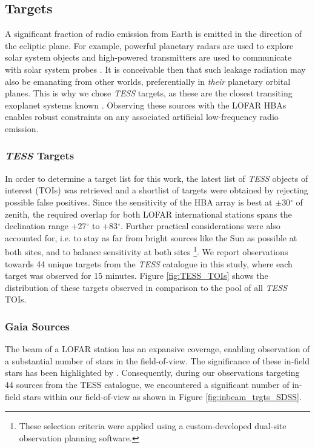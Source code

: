 \subsection{Targets} \label{sc:targets}

 A significant fraction of radio emission from Earth is emitted in the direction of the ecliptic plane. For example, powerful planetary radars are used to explore solar system objects \citep{Siemion_KEPLER_ApJ} and high-powered transmitters are used to communicate with solar system probes \citep{Enriquez:2017}. It is conceivable then that such leakage radiation may also be emanating from other worlds, preferentially in \textit{their} planetary orbital planes. This is why we chose \textit{TESS} targets, as these are the closest transiting exoplanet systems known \citep{kepler_2008,TESS_2015}. Observing these sources with the LOFAR HBAs enables robust constraints on any associated artificial low-frequency radio emission.  


\subsubsection{\textit{TESS} Targets} In order to determine a target list for this work, the latest list of \textit{TESS} objects of interest (TOIs) was retrieved \citep{NEA12} and a shortlist of targets were obtained by rejecting possible false positives. Since the sensitivity of the HBA array is best at $\pm$30$^\circ$ of zenith, the required overlap for both LOFAR international stations spans the declination range +27$^\circ$ to +83$^\circ$. Further practical considerations were also accounted for, i.e. to stay as far from bright sources like the Sun as possible at both sites, and to balance sensitivity at both sites \citep{D-SOP}\footnote{These selection criteria were applied using a custom-developed dual-site observation planning software.}. We report observations towards 44 unique targets from the \textit{TESS} catalogue in this study, where each target was observed for 15 minutes. Figure \ref{fig:TESS_TOIs} shows the distribution of these targets observed in comparison to the pool of all \textit{TESS} TOIs. 

\subsubsection{Gaia Sources}
The beam of a LOFAR station has an expansive coverage, enabling observation of a substantial number of stars in the field-of-view. The significance of these in-field stars has been highlighted by \cite{Bart-Wlodarczyk-Sroka}. Consequently, during our observations targeting 44 sources from the TESS catalogue, we encountered a significant number of in-field stars within our field-of-view as shown in Figure \ref{fig:inbeam_trgts_SDSS}. 

